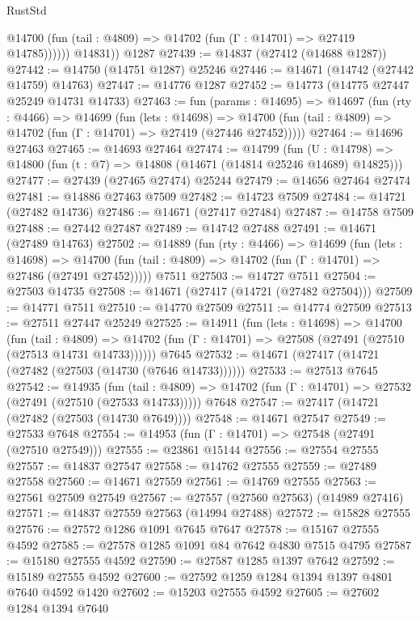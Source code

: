 \begin{lexlean}{RustStd}
\begin{coremodule}
              @14700 (fun (tail : @4809) => @14702 (fun (Γ : @14701) => @27419 @14785))))))
        @14831))
    @1287
@27439 := @14837 (@27412 (@14688 @1287))
@27442 := @14750 (@14751 @1287) @25246
@27446 := @14671 (@14742 (@27442 @14759) @14763)
@27447 := @14776 @1287
@27452 := @14773 (@14775 @27447 @25249 @14731 @14733)
@27463 := fun (params : @14695) =>
  @14697
    (fun (rty : @4466) =>
    @14699
      (fun (lets : @14698) =>
      @14700 (fun (tail : @4809) => @14702 (fun (Γ : @14701) => @27419 (@27446 @27452)))))
@27464 := @14696 @27463
@27465 := @14693 @27464
@27474 := @14799
    (fun (U : @14798) => @14800 (fun (t : @7) => @14808 (@14671 (@14814 @25246 @14689) @14825)))
@27477 := @27439 (@27465 @27474) @25244
@27479 := @14656 @27464 @27474
@27481 := @14886 @27463 @7509
@27482 := @14723 @7509
@27484 := @14721 (@27482 @14736)
@27486 := @14671 (@27417 @27484)
@27487 := @14758 @7509
@27488 := @27442 @27487
@27489 := @14742 @27488
@27491 := @14671 (@27489 @14763)
@27502 := @14889
    (fun (rty : @4466) =>
    @14699
      (fun (lets : @14698) =>
      @14700 (fun (tail : @4809) => @14702 (fun (Γ : @14701) => @27486 (@27491 @27452)))))
    @7511
@27503 := @14727 @7511
@27504 := @27503 @14735
@27508 := @14671 (@27417 (@14721 (@27482 @27504)))
@27509 := @14771 @7511
@27510 := @14770 @27509
@27511 := @14774 @27509
@27513 := @27511 @27447 @25249
@27525 := @14911
    (fun (lets : @14698) =>
    @14700
      (fun (tail : @4809) =>
      @14702 (fun (Γ : @14701) => @27508 (@27491 (@27510 (@27513 @14731 @14733))))))
    @7645
@27532 := @14671 (@27417 (@14721 (@27482 (@27503 (@14730 (@7646 @14733))))))
@27533 := @27513 @7645
@27542 := @14935
    (fun (tail : @4809) => @14702 (fun (Γ : @14701) => @27532 (@27491 (@27510 (@27533 @14733)))))
    @7648
@27547 := @27417 (@14721 (@27482 (@27503 (@14730 @7649))))
@27548 := @14671 @27547
@27549 := @27533 @7648
@27554 := @14953 (fun (Γ : @14701) => @27548 (@27491 (@27510 @27549)))
@27555 := @23861 @15144
@27556 := @27554 @27555
@27557 := @14837 @27547
@27558 := @14762 @27555
@27559 := @27489 @27558
@27560 := @14671 @27559
@27561 := @14769 @27555
@27563 := @27561 @27509 @27549
@27567 := @27557 (@27560 @27563) (@14989 @27416)
@27571 := @14837 @27559 @27563 (@14994 @27488)
@27572 := @15828 @27555
@27576 := @27572 @1286 @1091 @7645 @7647
@27578 := @15167 @27555 @4592
@27585 := @27578 @1285 @1091 @84 @7642 @4830 @7515 @4795
@27587 := @15180 @27555 @4592
@27590 := @27587 @1285 @1397 @7642
@27592 := @15189 @27555 @4592
@27600 := @27592 @1259 @1284 @1394 @1397 @4801 @7640 @4592 @1420
@27602 := @15203 @27555 @4592
@27605 := @27602 @1284 @1394 @7640

\end{coremodule}
\end{lexlean}
